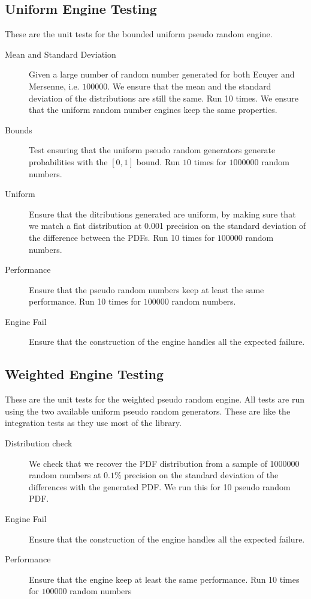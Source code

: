\documentclass[12pt,a4paper,article]{memoir} %
\begin{document}
\subsection{Uniform Engine Testing} 

These are the unit tests for the bounded uniform pseudo random engine.
	
\begin{description}
	\item [Mean and Standard Deviation]
		Given a large number of random number generated for
		both Ecuyer and Mersenne, i.e. $100000$.
		We ensure that the mean and the standard deviation 
		of the distributions are still the same. Run 10 times.
		We ensure that the uniform random number engines keep
		the same properties.
	\item [Bounds]
		Test ensuring that the uniform pseudo random generators
		generate probabilities with the $[0, 1]$ bound.
		Run $10$ times for $1000000$ random numbers.
	\item [Uniform]
		Ensure that the ditributions generated are uniform,
		by making sure that we match a flat distribution at 0.001
		precision on the standard deviation of the difference
		between the PDFs.
		Run 10 times for $100000$ random numbers.
	\item [Performance]
		Ensure that the pseudo random numbers keep at
		least the same performance.
		Run 10 times for $100000$ random numbers.
	\item [Engine Fail]
		Ensure that the construction of the engine 
		handles all the expected failure.
\end{description}

\subsection{Weighted Engine Testing} 
These are the unit tests for the weighted pseudo random engine.
All tests are run using the two available uniform pseudo random
generators. 
These are like the integration tests as they use most of the library.
\begin{description}
	\item [Distribution check]
		We check that we recover the PDF distribution from
		a sample of 1000000 random numbers at $0.1\%$ precision
		on the standard deviation of the differences with the 
		generated PDF.
		We run this for 10 pseudo random PDF.
	\item [Engine Fail]
		Ensure that the construction of the engine 
		handles all the expected failure.
	\item [Performance]
		Ensure that the engine keep at least the same performance.
		Run 10 times for $100000$ random  numbers	
\end{description}	
\end{document}
